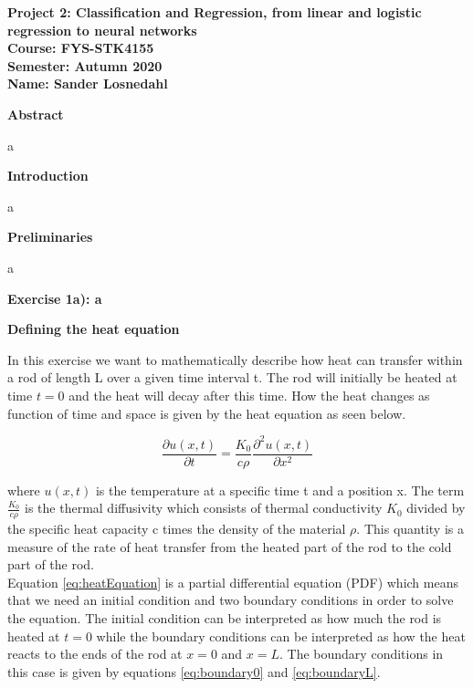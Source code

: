 \documentclass[12pt,a4paper]{article}
\begin{document}
\begin{center}
\LARGE{\textbf{Project 2: Classification and Regression, from linear and logistic regression to neural networks}}
\\
\large{\textbf{Course: FYS-STK4155}}
\\
\large{\textbf{Semester: Autumn 2020}}
\\
\large{\textbf{Name: Sander Losnedahl}}
\end{center}

\begin{center}
\Large{\textbf{Abstract}}
\end{center}

\noindent a

\newpage

\begin{center}
\Large{\textbf{Introduction}}
\end{center}

\noindent a

\newpage

\begin{center}
\Large{\textbf{Preliminaries}}
\end{center}

\noindent a

\newpage

\begin{center}
\Large{\textbf{Exercise 1a): a}}
\end{center}

\begin{center}
\large{\textbf{Defining the heat equation}}
\end{center}

\noindent In this exercise we want to mathematically describe how heat can transfer within a rod of length L over a given time interval t. The rod will initially be heated at time $t = 0$ and the heat will decay after this time. How the heat changes as function of time and space is given by the heat equation as seen below.

\begin{equation}\label{eq:heatEquation}
\frac{\partial u(x,t)}{\partial t} = \frac{K_0}{c\rho} \frac{\partial^2 u(x,t)}{\partial x^2} 
\end{equation}

\noindent where $u(x,t)$ is the temperature at a specific time t and a position x. The term $\frac{K_0}{c\rho}$ is the thermal diffusivity which consists of thermal conductivity $K_0$ divided by the specific heat capacity c times the density of the material $\rho$. This quantity is a measure of the rate of heat transfer from the heated part of the rod to the cold part of the rod. 
\\
Equation \ref{eq:heatEquation} is a partial differential equation (PDF) which means that we need an initial condition and two boundary conditions in order to solve the equation. The initial condition can be interpreted as how much the rod is heated at $t = 0$ while the boundary conditions can be interpreted as how the heat reacts to the ends of the rod at $x = 0$ and $x = L$. The boundary conditions in this case is given by equations \ref{eq:boundary0} and \ref{eq:boundaryL}.
\end{document}
